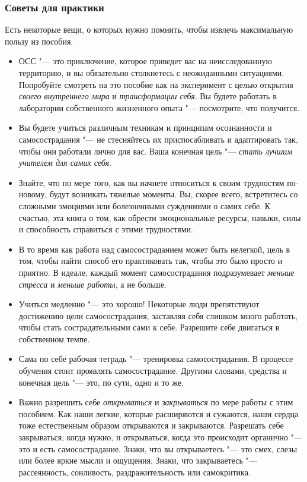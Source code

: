 	
	\subsubsection{Советы для практики}
	
	Есть некоторые вещи, о которых нужно помнить, чтобы извлечь максимальную пользу из пособия.  
	\begin{itemize}
		\item ОСС "--- это приключение, которое приведет вас на неисследованную территорию, и вы обязательно столкнетесь с неожиданными ситуациями.  Попробуйте смотреть на это пособие как на эксперимент с целью открытия \emph{своего внутреннего мира} и \emph{трансформации себя}. Вы будете работать в лаборатории собственного жизненного опыта "--- посмотрите, что получится.
		\item Вы будете учиться различным техникам и принципам осознанности и самосострадания "--- не стесняйтесь их приспосабливать и адаптировать так, чтобы они работали лично для вас. Ваша конечная цель "--- \emph{стать лучшим учителем для самих себя}.
		\item Знайте, что по мере того, как вы начнете относиться к своим трудностям по-новому, будут возникать тяжелые моменты. Вы, скорее всего, встретитесь со сложными эмоциями или болезненными суждениями о самих себе. К счастью, эта книга о том, как обрести эмоциональные ресурсы, навыки, силы и способность справиться с этими трудностями. 
		\item В то время как работа над самосостраданием может быть нелегкой, цель в том, чтобы найти способ его практиковать так, чтобы это было просто и приятно. В идеале,  каждый момент самосострадания подразумевает \emph{меньше стресса} и \emph{меньше работы}, а не больше. 
		\item Учиться медленно "--- это хорошо! Некоторые люди препятствуют достижению цели самосострадания, заставляя себя слишком много работать, чтобы стать сострадательными сами к себе. Разрешите себе двигаться в собственном темпе. 
		\item Сама по себе рабочая тетрадь "--- тренировка самосострадания. В процессе обучения стоит проявлять самосострадание. Другими словами, средства и конечная цель "--- это, по сути, одно и то же.
		\item Важно разрешить себе \emph{открываться} и \emph{закрываться} по мере работы с этим пособием. Как наши легкие, которые расширяются и сужаются, наши сердца тоже естественным образом открываются и закрываются. Разрешать себе закрываться, когда нужно, и открываться, когда это происходит органично "--- это и есть самосострадание. Знаки, что вы открываетесь "--- это смех, слезы или более яркие мысли и ощущения. Знаки, что закрываетесь "--- рассеянность, сонливость, раздражительность или самокритика.

\end{itemize}
